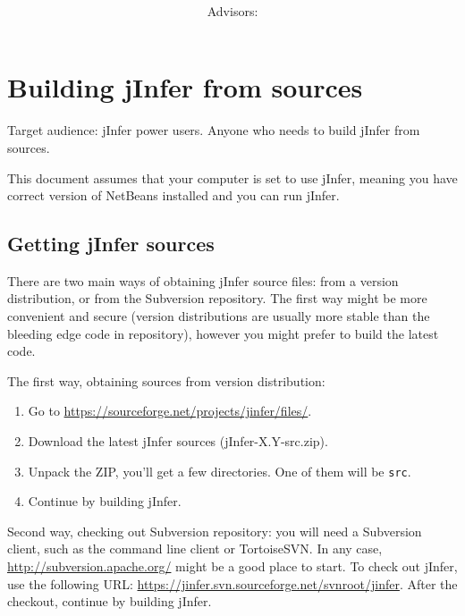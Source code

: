 \documentclass[a4paper,10pt,oneside]{article}
\title{\bf\mftitle}
\author{\mfauthor \\ Advisors: \mfadvisor}
\date{\mfplacedate}
\begin{document}
\maketitle




 
  
 



 \section*{Building jInfer from sources}
\par 
  Target audience: jInfer power users. Anyone who needs to build jInfer from sources.

\par 
  This document assumes that your computer is set to use jInfer, meaning you
    have correct version of NetBeans installed and you can run jInfer.

\subsection*{Getting jInfer sources}
\par 
There are two main ways of obtaining jInfer source files: from a version
  distribution, or from the Subversion repository. The first way might be more
  convenient and secure (version distributions are usually more stable than the
  bleeding edge code in repository), however you might prefer to build the
  latest code.

\par 
  The first way, obtaining sources from version distribution:

\begin{enumerate}\item 
 Go to \url{https://sourceforge.net/projects/jinfer/files/}.
  \item Download the latest jInfer sources (jInfer-X.Y-src.zip).
  \item Unpack the ZIP, you'll get a few directories. One of them will be \texttt{src}.
  \item Continue by building jInfer.
  \end{enumerate}
\par 
  Second way, checking out Subversion repository: you will need a
  Subversion client, such as the command line client or TortoiseSVN. In any case,
  \url{http://subversion.apache.org/}
might be a good place to start. To check out
  jInfer, use the following URL:
  \url{https://jinfer.svn.sourceforge.net/svnroot/jinfer}.
  After the checkout, continue by building jInfer.
\end{document}
